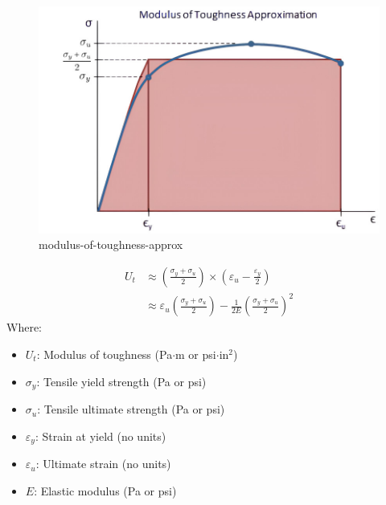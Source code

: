 \documentclass{article}
\begin{document}
\begin{center}
    \begin{minipage}{0.5\textwidth}\centering
        \begin{figure}[H]
            \centering
            \includegraphics[width=1\textwidth]{images/modulus-of-toughness-approx-01(1).jpg}
            \caption{modulus-of-toughness-approx}
            \label{fig:mot}
        \end{figure}
    \end{minipage}\hfil
    \begin{minipage}{0.45\textwidth}
        \begin{equation}
            \begin{aligned}
                U_t &\approx \left(\frac{\sigma_{y} + \sigma_{u}}{2}\right)\times\left(\varepsilon_u - \frac{\varepsilon_y}{2}\right)\\
                &\approx \varepsilon_u\left(\frac{\sigma_{y} + \sigma_{u}}{2}\right) -\frac{1}{2E}\left(\frac{\sigma_{y} + \sigma_{u}}{2}\right)^2
            \end{aligned}
        \end{equation}
        Where:
        \begin{itemize}[left=0pt, itemsep=-1mm]
            \item \( U_t \): Modulus of toughness (Pa\(\cdot\)m or psi\(\cdot\)in\(^2\))
            \item $\sigma_y$: Tensile yield strength (Pa or psi)
            \item $\sigma_u$: Tensile ultimate strength (Pa or psi)
            \item $\varepsilon_y$: Strain at yield (no units)
            \item $\varepsilon_u$: Ultimate strain (no units)
            \item $E$: Elastic modulus (Pa or psi)
        \end{itemize}
    \end{minipage}
\end{center}
\end{document}

